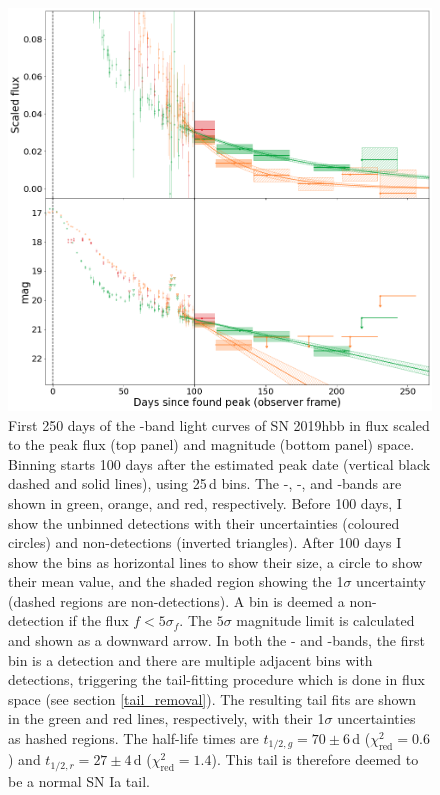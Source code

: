 \documentclass[a4paper,oneside,12pt, class=Latex/Classes/PhDthesisPSnPDF, crop=false]{standalone}
\begin{document}
\begin{figure}
 \centering
 \includegraphics[width=\textwidth]{../Images/chapter_3/bin_showcase.png}
 \caption[Example of a binned light curve.]{First 250 days of the \ztfg\ztfr\ztfi-band light curves of SN 2019hbb in flux scaled to the peak flux (top panel) and magnitude (bottom panel) space. Binning starts 100 days after the estimated peak date (vertical black dashed and solid lines), using 25\,d bins. The \ztfg-, \ztfr-, and \ztfi-bands are shown in green, orange, and red, respectively. Before 100 days, I show the unbinned detections with their uncertainties (coloured circles) and non-detections (inverted triangles). After 100 days I show the bins as horizontal lines to show their size, a circle to show their mean value, and the shaded region showing the 1$\sigma$ uncertainty (dashed regions are non-detections). A bin is deemed a non-detection if the flux $f<5\sigma_f$. The $5\sigma$ magnitude limit is calculated and shown as a downward arrow. In both the \ztfg- and \ztfr-bands, the first bin is a detection and there are multiple adjacent bins with detections, triggering the tail-fitting procedure which is done in flux space (see section \ref{tail_removal}). The resulting tail fits are shown in the green and red lines, respectively, with their 1$\sigma$ uncertainties as hashed regions. The half-life times are $t_{1/2,g} = 70 \pm 6$\,d ($\chi^2_\text{red} = 0.6$) and $t_{1/2,r} = 27 \pm 4$\,d ($\chi^2_\text{red} = 1.4$). This tail is therefore deemed to be a normal SN Ia tail.}
 \label{bin_showcase}
\end{figure}
\end{document}
